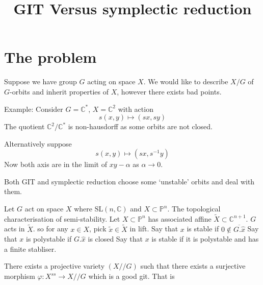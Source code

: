% 

\title{GIT Versus symplectic reduction}
\author{}
\date{}

 
\maketitle

\section{The problem } %

Suppose we have group $G$ acting on space $X$. 
We would like to describe $ X/G $ of $ G$-orbits and inherit properties of $X$, 
however there exists bad points. 

Example: 
Consider $ G = \mathbb{C} ^* $, $ X = \mathbb{C} ^2 $ with action 
\begin{equation}
    s(x,y) \mapsto (sx, sy) 
\end{equation}
The quotient $ \mathbb{C} ^2 / \mathbb{C} ^* $ is non-hausdorff as some orbits are not closed. 

Alternatively suppose
\begin{equation}
    s(x,y) \mapsto (sx, s^{-1} y) 
\end{equation}
Now both axis are in the limit of $xy- \alpha $ as $\alpha \rightarrow 0 $.

Both GIT and symplectic reduction choose some `unstable' orbits and deal with them. 


Let $ G$ act on space $X$ where $ \mathrm{SL} ( n , \mathbb{C} ) $ and $ X \subset \mathbb{P} ^n $.
The topological characterisation of semi-stability. 
Let $X \subset \mathbb{P} ^n $ has associated affine $ \tilde{X} \subset \mathbb{C} ^{n+1} $. 
$G$ acts in $ \tilde{X} $. 
so for any $ x \in X $, pick $ \tilde{x} \in \tilde{X} $ in lift.
Say that $x$ is stable if $0 \notin \overline{G . \hat{x} } $
Say that $x$ is polystable if $G . \hat{x}  $ is closed 
Say that $x$ is stable if it is polystable and has a finite stabliser.

\begin{theorem}
    There exists a projective variety $( X//G ) $ such that there exists a surjective morphism 
    $\varphi : X^{ss} \rightarrow X//G $ which is a good git. 
    That is 
\end{theorem}

